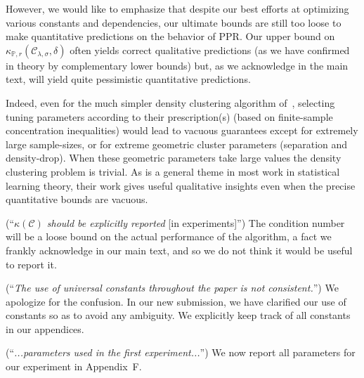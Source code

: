 \documentclass{article}
\newcommand{\vol}{\mathrm{vol}}
\newcommand{\1}{\mathbf{1}}
\newcommand{\mc}[1]{\mathcal{#1}}
\newcommand{\Pbb}{\mathbb{P}}
\newcommand{\wh}[1]{\widehat{#1}}
\theoremstyle{alden}
\theoremstyle{aldenthm}
\theoremstyle{definition}
\theoremstyle{remark}
\begin{document}
However, we would like to emphasize that despite our best efforts at optimizing various constants and dependencies, our ultimate bounds are still too loose to make quantitative predictions on the behavior of PPR. Our upper bound on $\kappa_{\Pbb,r}(\mc{C}_{\lambda,\sigma},\delta)$ often yields correct qualitative predictions (as we have confirmed in theory by complementary lower bounds) but, as we acknowledge in the main text, will yield quite pessimistic quantitative predictions.

Indeed, even for the much simpler density clustering algorithm of~\citet{chaudhuri2010}, selecting tuning parameters according to their prescription(s) (based on finite-sample concentration inequalities) would lead to vacuous guarantees except for extremely large sample-sizes, or for extreme geometric cluster parameters (separation and density-drop). When these geometric parameters take large values the density clustering problem is trivial. As is a general theme in most work in statistical learning theory, their work gives useful qualitative insights even when the precise quantitative bounds are vacuous.

%

(``\textit{$\kappa(\mc{C})$ should be explicitly reported} [in experiments]'') The condition number will be a loose bound on the actual performance of the algorithm, a fact we frankly acknowledge in our main text, and so we do not think it would be useful to report it.

(``\textit{The use of universal constants throughout the paper is not consistent.}'') We apologize for the confusion. In our new submission, we have clarified our use of constants so as to avoid any ambiguity. We explicitly keep track of all constants in our appendices.

(``\textit{...parameters used in the first experiment...}'') We now report all parameters for our experiment in Appendix~F. 
\end{document}
